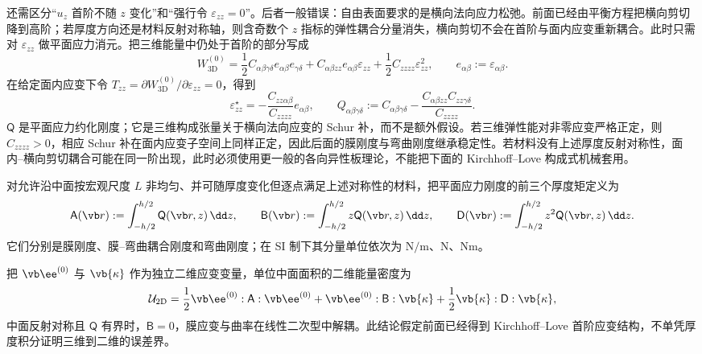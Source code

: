 还需区分“\(u_z\) 首阶不随 \(z\) 变化”和“强行令 \(\varepsilon_{zz}=0\)”。后者一般错误：自由表面要求的是横向法向应力松弛。前面已经由平衡方程把横向剪切降到高阶；若厚度方向还是材料反射对称轴，则含奇数个 \(z\) 指标的弹性耦合分量消失，横向剪切不会在首阶与面内应变重新耦合。此时只需对 \(\varepsilon_{zz}\) 做平面应力消元。把三维能量中仍处于首阶的部分写成
\[
 W_{3\mathrm D}^{(0)}
 =\frac12 C_{\alpha\beta\gamma\delta}
 e_{\alpha\beta}e_{\gamma\delta}
 +C_{\alpha\beta zz}e_{\alpha\beta}\varepsilon_{zz}
 +\frac12C_{zzzz}\varepsilon_{zz}^2,
 \qquad e_{\alpha\beta}:=\varepsilon_{\alpha\beta}.
\]
在给定面内应变下令 \(T_{zz}=\partial W_{3\mathrm D}^{(0)}/\partial\varepsilon_{zz}=0\)，得到
\begin{equation}
 \varepsilon_{zz}^{\star}
 =-\frac{C_{zz\alpha\beta}}{C_{zzzz}}e_{\alpha\beta},
 \qquad
 Q_{\alpha\beta\gamma\delta}
 :=C_{\alpha\beta\gamma\delta}
 -\frac{C_{\alpha\beta zz}C_{zz\gamma\delta}}{C_{zzzz}}.
 \label{eq:phys-cont-plane-stress-schur}
\end{equation}
\(\mathsf Q\) 是平面应力约化刚度；它是三维构成张量关于横向法向应变的 Schur 补，而不是额外假设。若三维弹性能对非零应变严格正定，则 \(C_{zzzz}>0\)，相应 Schur 补在面内应变子空间上同样正定，因此后面的膜刚度与弯曲刚度继承稳定性。若材料没有上述厚度反射对称性，面内--横向剪切耦合可能在同一阶出现，此时必须使用更一般的各向异性板理论，不能把下面的 Kirchhoff--Love 构成式机械套用。

对允许沿中面按宏观尺度 \(L\) 非均匀、并可随厚度变化但逐点满足上述对称性的材料，把平面应力刚度的前三个厚度矩定义为
\begin{equation}
 \mathsf A(\vb r):=\int_{-h/2}^{h/2}\mathsf Q(\vb r,z)\,\dd z,
 \qquad
 \mathsf B(\vb r):=\int_{-h/2}^{h/2}z\mathsf Q(\vb r,z)\,\dd z,
 \qquad
 \mathsf D(\vb r):=\int_{-h/2}^{h/2}z^2\mathsf Q(\vb r,z)\,\dd z.
 \label{eq:phys-cont-general-plate-rigidity}
\end{equation}
它们分别是膜刚度、膜--弯曲耦合刚度和弯曲刚度；在 SI 制下其分量单位依次为 \(\si{\newton\per\metre}\)、\(\si{\newton}\)、\(\si{\newton\metre}\)。

\begin{proposition}[厚度矩与膜弯曲解耦]
把 \(\vb \ee^{(0)}\) 与 \(\vb{\kappa}\) 作为独立二维应变变量，单位中面面积的二维能量密度为
\begin{equation}
 \mathcal U_{2\mathrm D}
 =\frac12\vb \ee^{(0)}:\mathsf A:\vb \ee^{(0)}
 +\vb \ee^{(0)}:\mathsf B:\vb{\kappa}
 +\frac12\vb{\kappa}:\mathsf D:\vb{\kappa},
 \label{eq:phys-cont-abd-energy}
\end{equation}
中面反射对称且 $\mathsf Q$ 有界时，$\mathsf B=0$，膜应变与曲率在线性二次型中解耦。此结论假定前面已经得到 Kirchhoff--Love 首阶应变结构，不单凭厚度积分证明三维到二维的误差界。
\end{proposition}

